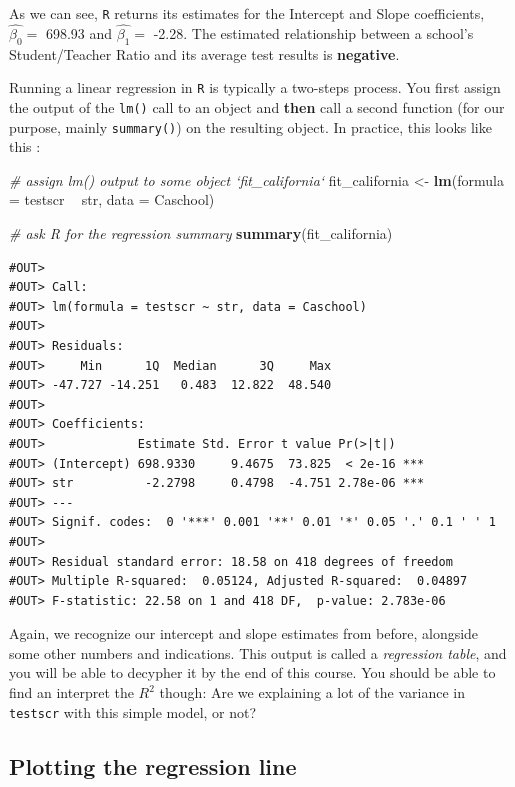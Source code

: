 \documentclass[]{book}
\newenvironment{Shaded}{\begin{snugshade}}{\end{snugshade}}
\newcommand{\KeywordTok}[1]{\textcolor[rgb]{0.13,0.29,0.53}{\textbf{#1}}}
\newcommand{\DataTypeTok}[1]{\textcolor[rgb]{0.13,0.29,0.53}{#1}}
\newcommand{\StringTok}[1]{\textcolor[rgb]{0.31,0.60,0.02}{#1}}
\newcommand{\CommentTok}[1]{\textcolor[rgb]{0.56,0.35,0.01}{\textit{#1}}}
\newcommand{\OperatorTok}[1]{\textcolor[rgb]{0.81,0.36,0.00}{\textbf{#1}}}
\newcommand{\NormalTok}[1]{#1}
\theoremstyle{definition}
\theoremstyle{definition}
\theoremstyle{definition}
\theoremstyle{remark}
\begin{document}
As we can see, \texttt{R} returns its estimates for the Intercept and
Slope coefficients, \(\hat{\beta_0} =\) 698.93 and \(\hat{\beta_1} =\)
-2.28. The estimated relationship between a school's Student/Teacher
Ratio and its average test results is \textbf{negative}.

Running a linear regression in \texttt{R} is typically a two-steps
process. You first assign the output of the \texttt{lm()} call to an
object and \textbf{then} call a second function (for our purpose, mainly
\texttt{summary()}) on the resulting object. In practice, this looks
like this :

\begin{Shaded}
\begin{Highlighting}[]
\CommentTok{# assign lm() output to some object `fit_california`}
\NormalTok{fit_california <-}\StringTok{ }\KeywordTok{lm}\NormalTok{(}\DataTypeTok{formula =}\NormalTok{ testscr }\OperatorTok{~}\StringTok{ }\NormalTok{str, }\DataTypeTok{data =}\NormalTok{ Caschool)}

\CommentTok{# ask R for the regression summary}
\KeywordTok{summary}\NormalTok{(fit_california) }
\end{Highlighting}
\end{Shaded}

\begin{verbatim}
#OUT> 
#OUT> Call:
#OUT> lm(formula = testscr ~ str, data = Caschool)
#OUT> 
#OUT> Residuals:
#OUT>     Min      1Q  Median      3Q     Max 
#OUT> -47.727 -14.251   0.483  12.822  48.540 
#OUT> 
#OUT> Coefficients:
#OUT>             Estimate Std. Error t value Pr(>|t|)    
#OUT> (Intercept) 698.9330     9.4675  73.825  < 2e-16 ***
#OUT> str          -2.2798     0.4798  -4.751 2.78e-06 ***
#OUT> ---
#OUT> Signif. codes:  0 '***' 0.001 '**' 0.01 '*' 0.05 '.' 0.1 ' ' 1
#OUT> 
#OUT> Residual standard error: 18.58 on 418 degrees of freedom
#OUT> Multiple R-squared:  0.05124, Adjusted R-squared:  0.04897 
#OUT> F-statistic: 22.58 on 1 and 418 DF,  p-value: 2.783e-06
\end{verbatim}

Again, we recognize our intercept and slope estimates from before,
alongside some other numbers and indications. This output is called a
\emph{regression table}, and you will be able to decypher it by the end
of this course. You should be able to find an interpret the \(R^2\)
though: Are we explaining a lot of the variance in \texttt{testscr} with
this simple model, or not?

\subsection{Plotting the regression
line}\label{plotting-the-regression-line}
\end{document}
